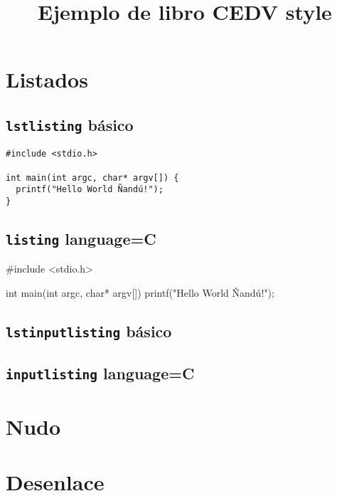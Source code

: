 \documentclass{cedv-book}
\title{Ejemplo de libro CEDV style}
\begin{document}
\maketitle

\chapter{Listados}

\section{\lstinline{lstlisting} básico}

\begin{lstlisting}
#include <stdio.h>

int main(int argc, char* argv[]) {
  printf("Hello World Ñandú!");
}
\end{lstlisting}


\section{\lstinline{listing} language=C}

\begin{listing}[language=C]
#include <stdio.h>

int main(int argc, char* argv[]) {
  printf("Hello World Ñandú!");
}
\end{listing}

\section{\lstinline{lstinputlisting} básico}




\section{\lstinline{inputlisting} language=C}



\chapter{Nudo}

\chapter{Desenlace}
\end{document}
